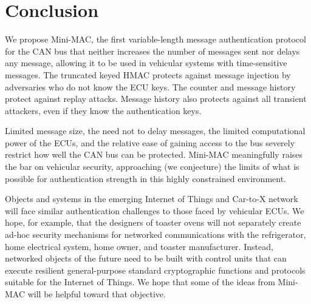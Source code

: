 \section{Conclusion}
\label{conclude}

We propose Mini-MAC, the first variable-length message authentication
protocol for the CAN bus that neither increases the number of messages sent
nor delays any message,
allowing it to be used in vehicular systems with time-sensitive messages.  
The truncated keyed HMAC protects against
message injection by adversaries who do not know the ECU keys.  
The counter and message history protect against replay attacks.  
Message history also protects against all transient attackers, even if they know the authentication keys.

Limited message size, the need not to delay messages, the limited computational power of the ECUs,
and the relative ease of gaining access to the bus severely restrict how well the CAN bus can be protected.  
Mini-MAC meaningfully raises the bar on vehicular security,
approaching (we conjecture) the limits of what is possible for authentication strength in this highly
constrained environment.

Objects and systems in the emerging Internet of Things and Car-to-X network
will face similar authentication challenges to those faced by 
vehicular ECUs.  We hope, for example, that the designers of toaster ovens will not
separately create ad-hoc security mechanisms for networked communications with
the refrigerator, home electrical system, home owner, and toaster manufacturer.
Instead, networked objects of the future need to be built with 
control units that can execute resilient general-purpose standard cryptographic 
functions and protocols suitable for the Internet of Things.  We hope that some
of the ideas from Mini-MAC will be helpful toward that objective.


